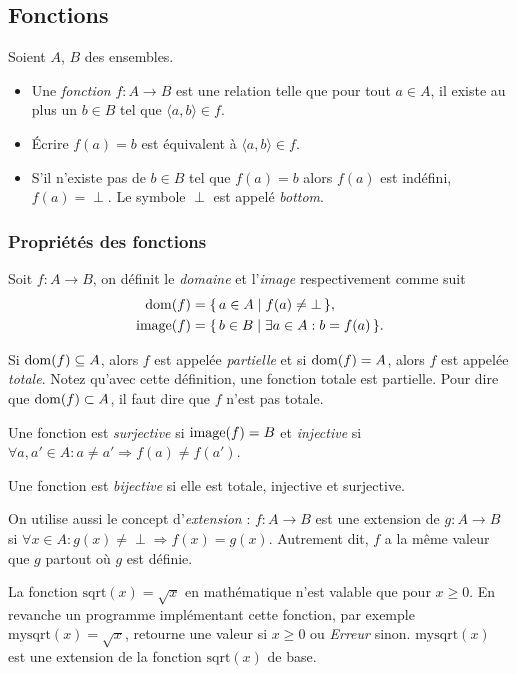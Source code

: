 
\subsection{Fonctions}
\label{subsec:fonctions}
Soient $A$, $B$ des ensembles.
\begin{itemize}
  	\item Une \emph{fonction} $f \colon A \rightarrow B$ est une relation telle que pour tout $a \in
	A$, il existe au plus un $b \in B$ tel que $\langle a,b \rangle \in f$.
	\item Écrire $f(a)=b$ est équivalent à $\langle a,b \rangle \in f$.
	\item S'il n'existe pas de $b \in B$ tel que $f(a)=b$ alors $f(a)$ est indéfini,
		$f(a) = \perp$.  Le symbole $\perp$ est appelé \emph{bottom}.
\end{itemize}

\subsubsection{Propriétés des fonctions}
\label{par:proprietes_des_fonctions}
Soit $f\colon A \to B$, on définit le \emph{domaine} et l'\emph{image} respectivement comme suit
\begin{align*}
  \operatorname{dom}(f)   & = \{\, a \in A \mid f(a) \neq \bot \,\},\\
  \operatorname{image}(f) & = \{\, b \in B \mid \exists a \in A : b = f(a) \,\}.
\end{align*}

Si $\operatorname{dom}(f) \subseteq A$, alors $f$ est appelée \emph{partielle} et si $\operatorname{dom}(f) = A$, alors $f$ est appelée \emph{totale}.
Notez qu'avec cette définition, une fonction totale est partielle.
Pour dire que $\operatorname{dom}(f) \subset A$, il faut dire que $f$ n'est pas totale.

Une fonction est \emph{surjective} si $\operatorname{image}(f) = B$ et \emph{injective} si $\forall a,a' \in A : a \neq a' \Rightarrow f(a) \neq f(a')$.

Une fonction est \emph{bijective} si elle est totale, injective et surjective.

On utilise aussi le concept d'\emph{extension} :
$f: A \rightarrow B$ est une extension de $g: A \rightarrow B$ si $\forall x \in A : g(x)\neq \perp \Rightarrow f(x) = g(x)$.
Autrement dit, $f$ a la même valeur que $g$ partout où $g$ est définie.

La fonction $\mathrm{sqrt}(x) = \sqrt{x}$ en mathématique n'est valable que pour $x\geq0$. En revanche un programme implémentant cette fonction, par exemple $\mathrm{mysqrt}(x) = \sqrt{x}$, retourne une valeur si $x\geq0$ ou \textit{Erreur} sinon. $\mathrm{mysqrt}(x)$ est une extension de la fonction $\mathrm{sqrt}(x)$ de base.

